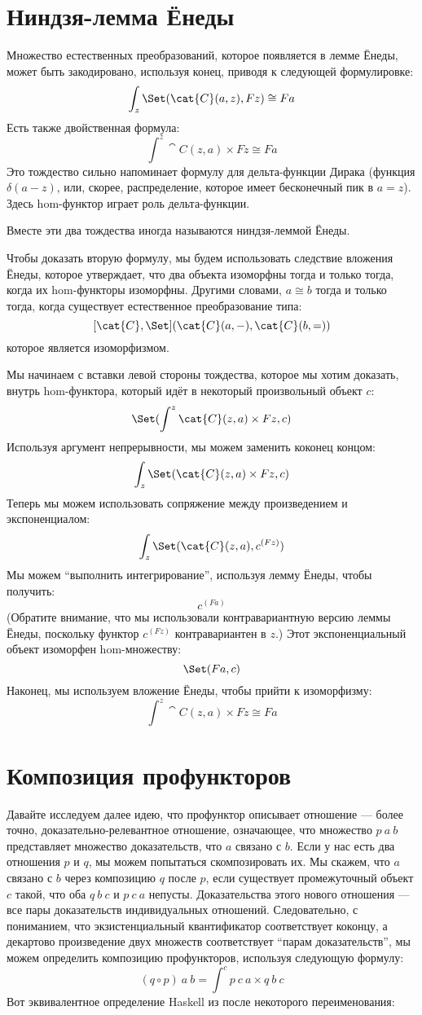 \section{Ниндзя-лемма Ёнеды}

Множество естественных преобразований, которое появляется в лемме Ёнеды, может
быть закодировано, используя конец, приводя к следующей формулировке:
\[\int_z \Set(\cat{C}(a, z), F z) \cong F a\]
Есть также двойственная формула:
\[\int^z \cat{C}(z, a)\times{}F z \cong F a\]
Это тождество сильно напоминает формулу для дельта-функции
Дирака (функция $\delta(a - z)$, или, скорее, распределение, которое
имеет бесконечный пик в $a = z$). Здесь hom-функтор играет
роль дельта-функции.

Вместе эти два тождества иногда называются ниндзя-леммой Ёнеды.

Чтобы доказать вторую формулу, мы будем использовать следствие
вложения Ёнеды, которое утверждает, что два объекта изоморфны тогда и только тогда, когда
их hom-функторы изоморфны. Другими словами, $a \cong b$ тогда и
только тогда, когда существует естественное преобразование типа:
\[[\cat{C}, \Set](\cat{C}(a, -), \cat{C}(b, =))\]
которое является изоморфизмом.

Мы начинаем с вставки левой стороны тождества, которое мы хотим
доказать, внутрь hom-функтора, который идёт в некоторый произвольный объект
$c$:
\[\Set(\int^z \cat{C}(z, a)\times{}F z, c)\]
Используя аргумент непрерывности, мы можем заменить коконец концом:
\[\int_z \Set(\cat{C}(z, a)\times{}F z, c)\]
Теперь мы можем использовать сопряжение между произведением и
экспоненциалом:
\[\int_z \Set(\cat{C}(z, a), c^{(F z)})\]
Мы можем ``выполнить интегрирование'', используя лемму Ёнеды, чтобы получить:
\[c^{(F a)}\]
(Обратите внимание, что мы использовали контравариантную версию леммы Ёнеды,
поскольку функтор $c^{(F z)}$ контравариантен в $z$.)
Этот экспоненциальный объект изоморфен hom-множеству:
\[\Set(F a, c)\]
Наконец, мы используем вложение Ёнеды, чтобы прийти к
изоморфизму:
\[\int^z \cat{C}(z, a)\times{}F z \cong F a\]

\section{Композиция профункторов}

Давайте исследуем далее идею, что профунктор описывает отношение
--- более точно, доказательно-релевантное отношение, означающее, что множество
$p\ a\ b$ представляет множество доказательств, что $a$ связано
с $b$. Если у нас есть два отношения $p$ и $q$, мы можем
попытаться скомпозировать их. Мы скажем, что $a$ связано с $b$
через композицию $q$ после $p$, если существует
промежуточный объект $c$ такой, что оба $q\ b\ c$ и
$p\ c\ a$ непусты. Доказательства этого нового отношения --- все
пары доказательств индивидуальных отношений. Следовательно, с
пониманием, что экзистенциальный квантификатор соответствует коконцу,
а декартово произведение двух множеств соответствует ``парам
доказательств'', мы можем определить композицию профункторов, используя следующую
формулу:
\[(q \circ p)\ a\ b = \int^c p\ c\ a\times{}q\ b\ c\]
Вот эквивалентное определение Haskell из
 после некоторого переименования:


